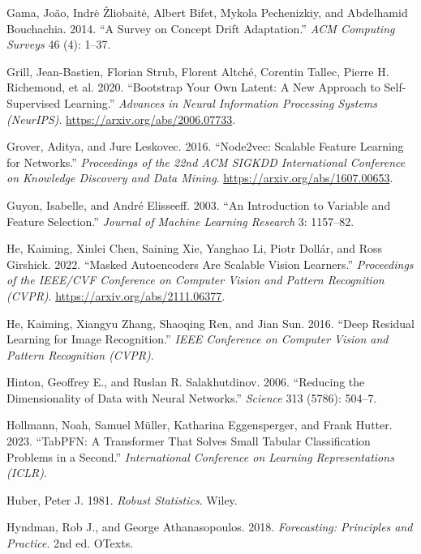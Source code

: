 \begin{CSLReferences}{1}{1}
Gama, João, Indrė Žliobaitė, Albert Bifet, Mykola Pechenizkiy, and Abdelhamid Bouchachia. 2014. {``A Survey on Concept Drift Adaptation.''} \emph{ACM Computing Surveys} 46 (4): 1--37.

{Grill, Jean-Bastien, Florian Strub, Florent Altché, Corentin Tallec, Pierre H. Richemond, et al.} 2020. {``Bootstrap Your Own Latent: A New Approach to Self-Supervised Learning.''} \emph{Advances in Neural Information Processing Systems (NeurIPS)}. \url{https://arxiv.org/abs/2006.07733}.

Grover, Aditya, and Jure Leskovec. 2016. {``Node2vec: Scalable Feature Learning for Networks.''} \emph{Proceedings of the 22nd ACM SIGKDD International Conference on Knowledge Discovery and Data Mining}. \url{https://arxiv.org/abs/1607.00653}.

Guyon, Isabelle, and André Elisseeff. 2003. {``An Introduction to Variable and Feature Selection.''} \emph{Journal of Machine Learning Research} 3: 1157--82.

He, Kaiming, Xinlei Chen, Saining Xie, Yanghao Li, Piotr Dollár, and Ross Girshick. 2022. {``Masked Autoencoders Are Scalable Vision Learners.''} \emph{Proceedings of the IEEE/CVF Conference on Computer Vision and Pattern Recognition (CVPR)}. \url{https://arxiv.org/abs/2111.06377}.

He, Kaiming, Xiangyu Zhang, Shaoqing Ren, and Jian Sun. 2016. {``Deep Residual Learning for Image Recognition.''} \emph{IEEE Conference on Computer Vision and Pattern Recognition (CVPR)}.

Hinton, Geoffrey E., and Ruslan R. Salakhutdinov. 2006. {``Reducing the Dimensionality of Data with Neural Networks.''} \emph{Science} 313 (5786): 504--7.

Hollmann, Noah, Samuel Müller, Katharina Eggensperger, and Frank Hutter. 2023. {``{TabPFN}: A Transformer That Solves Small Tabular Classification Problems in a Second.''} \emph{International Conference on Learning Representations (ICLR)}.

Huber, Peter J. 1981. \emph{Robust Statistics}. Wiley.

Hyndman, Rob J., and George Athanasopoulos. 2018. \emph{Forecasting: Principles and Practice}. 2nd ed. OTexts.


\end{CSLReferences}
